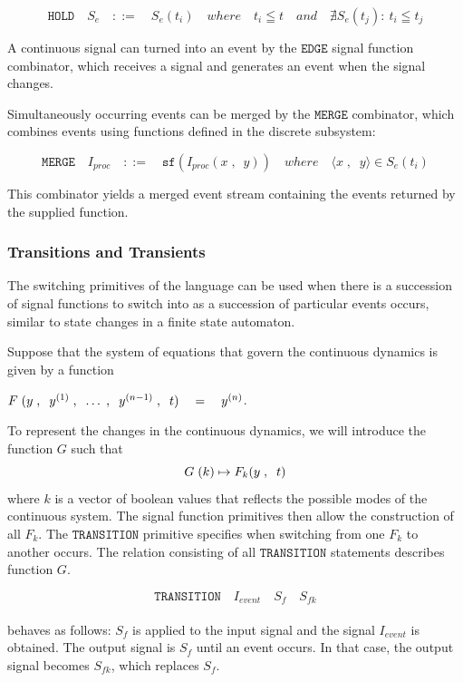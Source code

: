 \documentclass[a4paper]{article}
\begin{document}
\[\texttt{HOLD}\quad{}S_{e}\quad{}::=\quad{}S_{e}(t_{i})\quad{}where \quad{}t_{i}\leqq{}t\quad{} and \quad{}\nexists{S_{e}(t_{j})}:\:t_{i}\leqq{}t_{j}\]

A continuous signal can turned into an event by the $\texttt{EDGE}$
signal function combinator, which receives a signal and generates an
event when the signal changes.

Simultaneously occurring events can be merged by the $\texttt{MERGE}$
combinator, which combines events using functions defined in the
discrete subsystem:

\[\texttt{MERGE}\quad{}I_{proc}\quad{}::=\quad{}\texttt{sf}(I_{proc}(x\;,\:\;y))\quad{}where \quad{}\langle{}x\;,\;\;y\rangle{}\in{}S_{e}(t_{i})\]


This combinator yields a merged event stream containing the events
returned by the supplied function.

\subsubsection{Transitions and Transients}

The switching primitives of the language can be used when there is a
succession of signal functions to switch into as a succession of
particular events occurs, similar to state changes in a finite state
automaton.

Suppose that the system of equations that govern the continuous
dynamics is given by a function

$F\;{\mathrm\mathbf{}(}y\;,\;\;y^{(1)}\;,\;\;\ldots\;,\;\;y^{(n-1)}\;,\;\;t{\mathrm\mathbf{})}\quad{}=\quad{}y^{(n)}$. 

To represent the changes in the continuous dynamics, we will introduce
the function $G$ such
that \[G\;{\mathrm\mathbf{}(}k{\mathrm\mathbf{})}\mapsto{}F_{k}{\mathrm\mathbf{}(}y\;,\;\;t{\mathrm\mathbf{})}\]
where $k$ is a vector of boolean values that reflects the possible
modes of the continuous system. The signal function primitives then
allow the construction of all $F_{k}$. The $\texttt{TRANSITION}$ primitive
specifies when switching from one $F_{k}$ to another occurs. The
relation consisting of all $\texttt{TRANSITION}$ statements describes
function $G$.

\[\texttt{TRANSITION}\quad{}I_{event}\quad{}S_{f}\quad{}S_{fk}\]
\\  

behaves as follows: $S_{f}$ is applied to the input signal and the
signal $I_{event}$ is obtained. The output signal is $S_{f}$ until an
event occurs. In that case, the output signal becomes $S_{fk}$, which
replaces $S_{f}$.
\end{document}
